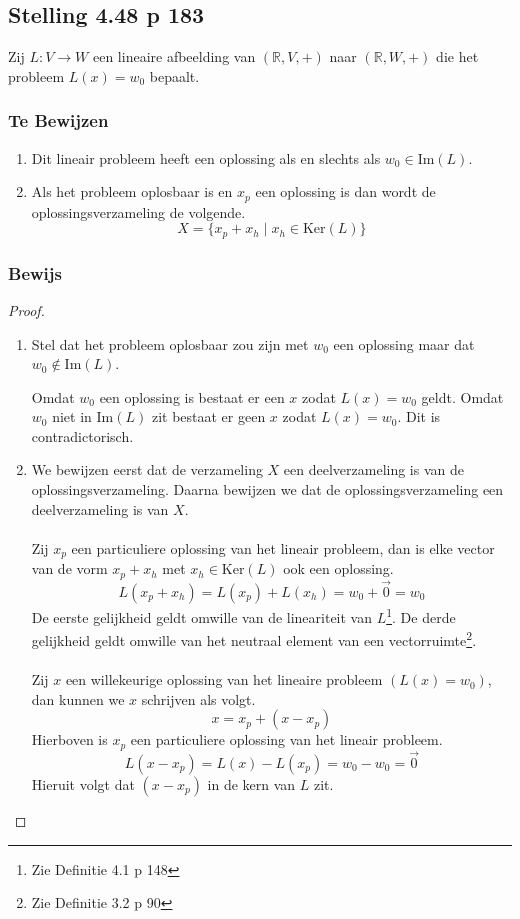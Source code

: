 \documentclass[lineaire_algebra_oplossingen.tex]{subfiles}
\begin{document}
\subsection{Stelling 4.48 p 183}
\label{4.48}
Zij $L:V\rightarrow W$ een lineaire afbeelding van $(\mathbb{R},V,+)$ naar $(\mathbb{R},W,+)$ die het probleem $L(x) = w_0$ bepaalt.

\subsubsection*{Te Bewijzen}
\begin{enumerate}
\item Dit lineair probleem heeft een oplossing als en slechts als $w_0 \in \text{Im}(L)$.

\item
Als het probleem oplosbaar is en $x_p$ een oplossing is dan wordt de oplossingsverzameling de volgende.
\[
X = \{x_p + x_h \mid x_h \in \text{Ker}(L)\}
\]
\end{enumerate}

\subsubsection*{Bewijs}
\begin{proof}~
\begin{enumerate}
\item Stel dat het probleem oplosbaar zou zijn met $w_0$ een oplossing maar dat $w_0 \not\in \text{Im}(L)$.

Omdat $w_0$ een oplossing is bestaat er een $x$ zodat $L(x) = w_0$ geldt. Omdat $w_0$ niet in $\text{Im}(L)$ zit bestaat er geen $x$ zodat $L(x) = w_0$. Dit is contradictorisch.

\item
We bewijzen eerst dat de verzameling $X$ een deelverzameling is van de oplossingsverzameling. Daarna bewijzen we dat de oplossingsverzameling een deelverzameling is van $X$.\\\\
Zij $x_p$ een particuliere oplossing van het lineair probleem, dan is elke vector van de vorm $x_p+x_h$ met $x_h\in \text{Ker}(L)$ ook een oplossing.
\[
L(x_p+x_h)=L(x_p)+L(x_h)=w_0+\vec{0} = w_0
\]
De eerste gelijkheid geldt omwille van de lineariteit van $L$\footnote{Zie Definitie 4.1 p 148}. De derde gelijkheid geldt omwille van het neutraal element van een vectorruimte\footnote{Zie Definitie 3.2 p 90}.\\\\
Zij $x$ een willekeurige oplossing van het lineaire probleem $(L(x)=w_0)$, dan kunnen we $x$ schrijven als volgt.
\[
x = x_p + (x-x_p)
\]
Hierboven is $x_p$ een particuliere oplossing van het lineair probleem.
\[
L(x-x_p) = L(x) - L(x_p) = w_0-w_0=\vec{0}
\]
Hieruit volgt dat $(x-x_p)$ in de kern van $L$ zit.
\end{enumerate}
\end{proof}
\end{document}
